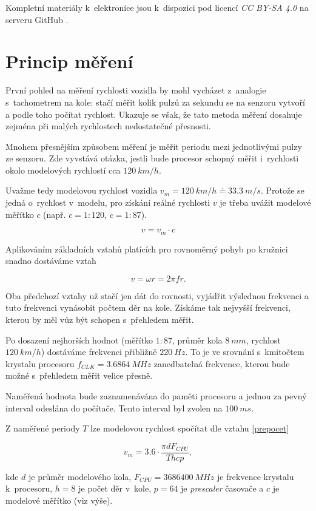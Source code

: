 Kompletní materiály k~elektronice jsou k~dispozici pod licencí \textit{CC BY-SA
4.0} na serveru GitHub \cite{wsm-pcb}.

\section{Princip měření}
\label{sec:wsm-mer-princip}

První pohled na měření rychlosti vozidla by mohl vycházet z~analogie
s~tachometrem na kole: stačí měřit kolik pulzů za sekundu se na senzoru vytvoří
a podle toho počítat rychlost. Ukazuje se však, že tato metoda měření dosahuje
zejména při malých rychlostech nedostatečné přesnosti.

Mnohem přesnějším způsobem měření je měřit periodu mezi jednotlivými pulzy ze
senzoru. Zde vyvstává otázka, jestli bude procesor schopný měřit i~rychlosti
okolo modelových rychlostí cca $120\ km/h$.

Uvažme tedy modelovou rychlost vozidla $v_m = 120\ km/h \doteq 33.3\ m/s$.
Protože se jedná o~rychlost v~modelu, pro získání reálné rychlosti $v$ je třeba
uvážit modelové měřítko $c$ (např. $c = 1:120$, $c = 1:87$).

$$v = v_m \cdot c$$

Aplikováním základních vztahů platících pro rovnoměrný pohyb po kružnici snadno
dostáváme vztah

$$v = \omega r = 2 \pi f r.$$

Oba předchozí vztahy už stačí jen dát do rovnosti, vyjádřit výslednou frekvenci
a tuto frekvenci vynásobit počtem děr na kole. Získáme tak nejvyšší frekvenci,
kterou by měl vůz být schopen s~přehledem měřit.

Po dosazení nejhorších hodnot (měřítko $1:87$, průměr kola $8\ mm$, rychlost
$120\ km/h$) dostáváme frekvenci přibližně $220\ Hz$. To je ve srovnání
s~kmitočtem krystalu procesoru $f_{CLK} = 3.6864\ MHz$ zanedbatelná frekvence,
kterou bude možné s~přehledem měřit velice přesně.

Naměřená hodnota bude zaznamenávána do paměti procesoru a jednou za pevný
interval odeslána do počítače. Tento interval byl zvolen na $100\ ms$.

Z naměřené periody $T$ lze modelovou rychlost spočítat dle vztahu
\ref{prepocet}

\begin{equation}
v_m = 3.6 \cdot \frac{\pi d F_{CPU}}{T h c p},
\label{prepocet}
\end{equation}

kde $d$ je průměr modelového kola, $F_{CPU} = 3686400\ MHz$ je frekvence
krystalu k~procesoru, $h = 8$ je počet děr v~kole, $p = 64$ je
\textit{prescaler} časovače a $c$ je modelové měřítko (viz výše).


